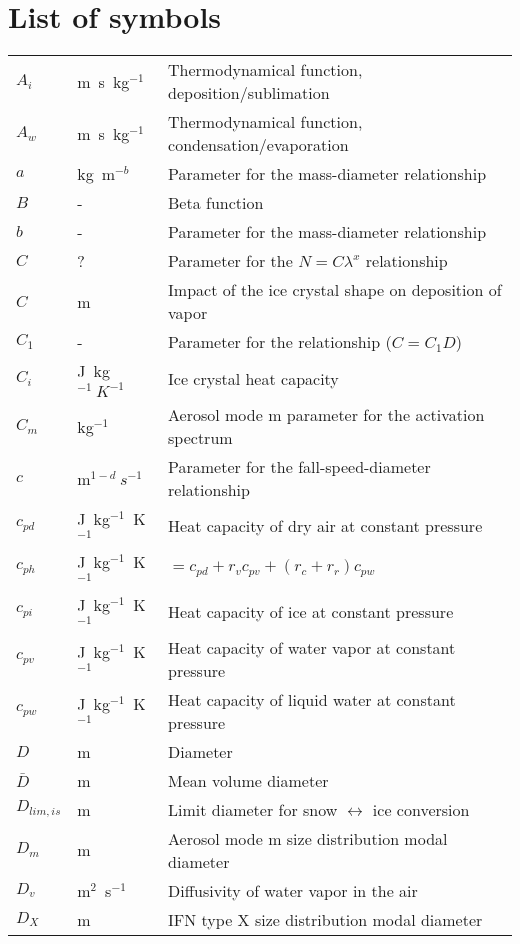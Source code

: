 {\section{List of symbols}
\setlongtables
\begin{longtable}{lll}
$A_i$ & m~s~kg$^{-1}$ & Thermodynamical function, deposition/sublimation \\
$A_w$ & m~s~kg$^{-1}$ & Thermodynamical function, condensation/evaporation \\
$a$ & kg~m$^{-b}$ & Parameter for the mass-diameter relationship \\
$B$ & - & Beta function \\
$b$ & - & Parameter for the mass-diameter relationship \\
$C$ & ? & Parameter for the $N=C \lambda^x$ relationship \\
$C$ & m & Impact of the ice crystal shape on deposition of vapor \\
$C_{1}$ & - & Parameter for the relationship ($C=C_{1}D$)\\
$C_i$ & J~kg$^{-1}~K^{-1}$ & Ice crystal heat capacity \\
$C_m$ & kg$^{-1}$ & Aerosol mode m parameter for the activation spectrum \\
$c$ & m$^{1-d}~s^{-1}$ & Parameter for the fall-speed-diameter relationship \\
$c_{pd}$ & J~kg$^{-1}$~K$^{-1}$ & Heat capacity of dry air at constant pressure \\
$c_{ph}$ & J~kg$^{-1}$~K$^{-1}$ & $=c_{pd} + r_v c_{pv} + (r_c + r_r) c_{pw} $ \\
$c_{pi}$ & J~kg$^{-1}$~K$^{-1}$ & Heat capacity of ice at constant pressure \\
$c_{pv}$ & J~kg$^{-1}$~K$^{-1}$ & Heat capacity of water vapor at constant pressure \\
$c_{pw}$ & J~kg$^{-1}$~K$^{-1}$ & Heat capacity of liquid water at constant pressure \\
$D$ & m & Diameter \\
$\bar{D}$ & m & Mean volume diameter \\
$D_{lim,is}$ & m & Limit diameter for snow $\leftrightarrow$ ice conversion \\
$D_m$ & m & Aerosol mode m size distribution modal diameter \\
$D_v$ & m$^2$~s$^{-1}$ & Diffusivity of water vapor in the air \\
$D_X$ & m & IFN type X size distribution modal diameter \\

\end{longtable}}
